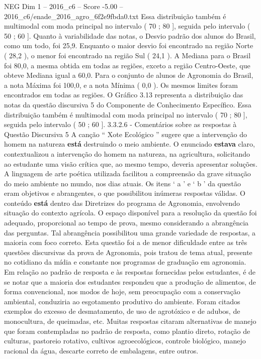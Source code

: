 \begin{textsample}{NEG Dim 1 – 2016\_c6 – Score -5.00 – 2016\_c6/enade\_2016\_agro\_6f2e9fbda0.txt}
Essa distribuição também é multimodal com moda principal no intervalo ( 70 ; 80 ], seguida pelo intervalo ( 50 ; 60 ].
Quanto à variabilidade das notas, o Desvio padrão dos alunos do Brasil, como um todo, foi 25,9.
Enquanto o maior desvio foi encontrado na região Norte ( 28,2 ), o menor foi encontrado na região Sul ( 24,1 ).
A Mediana para o Brasil foi 80,0, a mesma obtida em todas as regiões, exceto a região Centro-Oeste, que obteve Mediana igual a 60,0.
Para o conjunto de alunos de Agronomia do Brasil, a nota Máxima foi 100,0, e a nota Mínima ( 0,0 ).
Os mesmos limites foram encontrados em todas as regiões.
O Gráfico 3.13 representa a distribuição das notas da questão discursiva 5 do Componente de Conhecimento Específico.
Essa distribuição também é multimodal com moda principal no intervalo ( 70 ; 80 ], seguida pelo intervalo ( 50 ; 60 ]. 3.3.2.6 - Comentários sobre as respostas à Questão Discursiva 5 A canção “ Xote Ecológico ” sugere que a intervenção do homem na natureza \textbf{está} destruindo o meio ambiente.
O enunciado \textbf{estava} claro, contextualizou a intervenção do homem na natureza, na agricultura, solicitando ao estudante uma visão crítica que, ao mesmo tempo, deveria apresentar soluções.
A linguagem de arte poética utilizada facilitou a compreensão da grave situação do meio ambiente no mundo, nos dias atuais.
Os itens ‘ a ’ e ‘ b ’ da questão eram objetivos e abrangentes, o que possibilitou inúmeras respostas válidas.
O conteúdo \textbf{está} dentro das Diretrizes do programa de Agronomia, envolvendo situação do contexto agrícola.
O espaço disponível para a resolução da questão foi adequado, proporcional ao tempo de prova, mesmo considerando a abrangência das perguntas.
Tal abrangência possibilitou uma grande variedade de respostas, a maioria com foco correto.
Esta questão foi a de menor dificuldade entre as três questões discursivas da prova de Agronomia, pois tratou de tema atual, presente no cotidiano da mídia e constante nos programas de graduação em agronomia.
Em relação ao padrão de resposta e às respostas fornecidas pelos estudantes, é de se notar que a maioria dos estudantes respondeu que a produção de alimentos, de forma convencional, nos modos de hoje, sem preocupação com a conservação ambiental, conduziria ao esgotamento produtivo do ambiente.
Foram citados exemplos do excesso de desmatamento, de uso de agrotóxico e de adubos, de monocultura, de queimadas, etc.
Muitas respostas citaram alternativas de manejo que foram contempladas no padrão de resposta, como plantio direto, rotação de culturas, pastoreio rotativo, cultivos agroecológicos, controle biológico, manejo racional da água, descarte correto de embalagens, entre outros.

\end{textsample}
